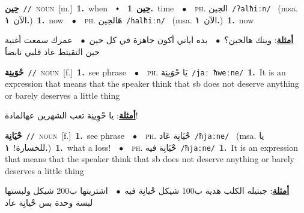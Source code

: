 \documentclass[10pt,a4paper,twoside]{article} %
\begin{document}
\begin{multicols}{2}
{\setlength\topsep{0pt}\textbf{\foreignlanguage{arabic}{حِين}}\ {\color{gray}\texttt{//}\color{black}}\ \textsc{noun}\ [m.]\ \textbf{1.}~when\ \ $\smblkdiamond$\ \ \setlength\topsep{0pt}\textbf{\foreignlanguage{arabic}{حِين}}\ \textbf{1.}~time\ \ $\bullet$\ \ \textsc{ph.} \color{gray} \foreignlanguage{arabic}{الحِين}\color{black}\ {\color{gray}\texttt{/{\sffamily ʔalħiːn}/}\color{black}}\ \color{gray} (msa. \foreignlanguage{arabic}{الآن}~\foreignlanguage{arabic}{\textbf{١.}})\color{black}\ \textbf{1.}~now\ \ $\bullet$\ \ \textsc{ph.} \color{gray} \foreignlanguage{arabic}{هَالحِين}\color{black}\ {\color{gray}\texttt{/{\sffamily halħiːn}/}\color{black}}\ \color{gray} (msa. \foreignlanguage{arabic}{الآن}~\foreignlanguage{arabic}{\textbf{١.}})\color{black}\ \textbf{1.}~now\  \begin{flushright}\color{gray}\foreignlanguage{arabic}{\textbf{\underline{\foreignlanguage{arabic}{أمثلة}}}: وينك هالحين؟\ $\bullet$\ \  بده اياني أكون جاهزة في كل حين\ $\bullet$\ \  عمرك سمعت أغنية حين التقيتط عاد قلبي نابضاََ}\end{flushright}\color{black}} \vspace{2mm}

{\setlength\topsep{0pt}\textbf{\foreignlanguage{arabic}{حْوَينِة}}\ {\color{gray}\texttt{//}\color{black}}\ \textsc{noun}\ [f.]\ \textbf{1.}~see phrase\ \ $\bullet$\ \ \textsc{ph.} \color{gray} \foreignlanguage{arabic}{يَا حْوَينِة}\color{black}\ {\color{gray}\texttt{/{\sffamily jaː ħweːne}/}\color{black}}\ \textbf{1.}~It is an expression that means that the speaker think that sb does not deserve anything or barely deserves a little thing\  \begin{flushright}\color{gray}\foreignlanguage{arabic}{\textbf{\underline{\foreignlanguage{arabic}{أمثلة}}}: يا حْوِينِة تعب الشهرين عهالمادة!}\end{flushright}\color{black}} \vspace{2mm}

{\setlength\topsep{0pt}\textbf{\foreignlanguage{arabic}{حْيَانِة}}\ {\color{gray}\texttt{//}\color{black}}\ \textsc{noun}\ [f.]\ \textbf{1.}~see phrase\ \ $\bullet$\ \ \textsc{ph.} \color{gray} \foreignlanguage{arabic}{حْيَانِة عَاد}\color{black}\ {\color{gray}\texttt{/{\sffamily ħjaːne}/}\color{black}}\ \color{gray} (msa. \foreignlanguage{arabic}{يا للخسارة!}~\foreignlanguage{arabic}{\textbf{١.}})\color{black}\ \textbf{1.}~what a loss!\ \ $\bullet$\ \ \textsc{ph.} \color{gray} \foreignlanguage{arabic}{حْيَانِة فيه}\color{black}\ {\color{gray}\texttt{/{\sffamily ħjaːne}/}\color{black}}\ \textbf{1.}~It is an expression that means that the speaker think that sb does not deserve anything or barely deserves a little thing\  \begin{flushright}\color{gray}\foreignlanguage{arabic}{\textbf{\underline{\foreignlanguage{arabic}{أمثلة}}}: جبتيله الكلب هدية ب100 شيكل حْيانِة فيه\ $\bullet$\ \  اشتريتها ب200 شيكل ولبستها لبسة وحدة بس حْيانِة عاد}\end{flushright}\color{black}} \vspace{2mm}


\end{multicols}
\end{document}
